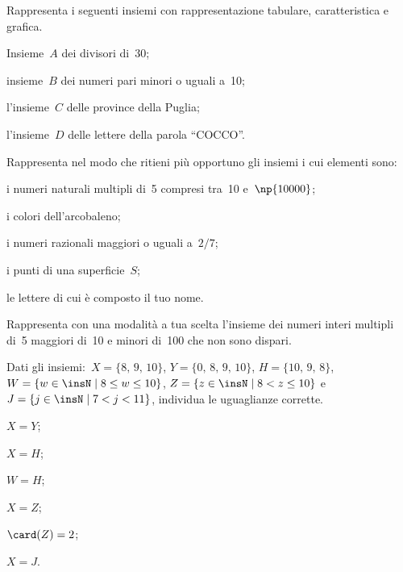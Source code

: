 \begin{esercizio}
\label{ese:5.34}
Rappresenta i seguenti insiemi con rappresentazione tabulare, caratteristica e grafica.
\begin{enumeratea}
\item Insieme~$A$ dei divisori di~30;
\item insieme~$B$ dei numeri pari minori o uguali a~10;
\item l'insieme~$C$ delle province della Puglia;
\item l'insieme~$D$ delle lettere della parola ``COCCO''.
\end{enumeratea}
\end{esercizio}
\begin{esercizio}
\label{ese:5.35}
Rappresenta nel modo che ritieni più opportuno gli insiemi i cui elementi sono:
\begin{enumeratea}
\item i numeri naturali multipli di~5 compresi tra~10 e~$\np{10000}$;
\item i colori dell'arcobaleno;
\item i numeri razionali maggiori o uguali a~$2/7$;
\item i punti di una superficie~$S$;
\item le lettere di cui è composto il tuo nome.
\end{enumeratea}
\end{esercizio}

\begin{esercizio}
\label{ese:5.36}
Rappresenta con una modalità a tua scelta l'insieme dei numeri interi multipli di~5 maggiori di~10 e minori di~100 che non
sono dispari.
\end{esercizio}

\pagebreak

\begin{esercizio}[\Ast]
\label{ese:5.37}
Dati gli insiemi:~$X=\{\text{8, 9, 10}\}$, $Y=\{\text{0, 8, 9, 10}\}$, $H=\{\text{10, 9, 8}\}$,
$W=\{w\in\insN\mid 8\le w\le 10\}$, $Z=\{z\in\insN\mid 8<z\le 10\}$ e~$J=\{j\in\insN\mid 7<j<11\}$,
individua le uguaglianze corrette.
\begin{multicols}{3}
\begin{enumeratea}
\item $X = Y$;
\item $X= H$;
\item $W = H$;
\item $X = Z$;
\item $\card (Z)=2$;
\item $X = J$.
\end{enumeratea}
\end{multicols}
\end{esercizio}

